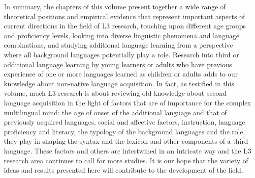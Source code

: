 \documentclass[output=paper,colorlinks,citecolor=brown,nonflat]{langsci/langscibook}
\begin{document}
In summary, the chapters of this volume present together a wide range of theoretical positions and empirical evidence that represent important aspects of current directions in the field of L3 research, touching upon different age groups and proficiency levels, looking into diverse linguistic phenomena and language combinations, and studying additional language learning from a perspective where all background languages potentially play a role. Research into third or additional language learning by young learners or adults who have previous experience of one or more languages learned as children or adults adds to our knowledge about non-native language acquisition. In fact, as testified in this volume, much L3 research is about reviewing old knowledge about second language acquisition in the light of factors that are of importance for the complex multilingual mind: the age of onset of the additional language and that of previously acquired languages, social and affective factors, instruction, language proficiency and literacy, the typology of the background languages and the role they play in shaping the syntax and the lexicon and other components of a third language. These factors and others are intertwined in an intricate way and the L3 research area continues to call for more studies. It is our hope that the variety of ideas and results presented here will contribute to the development of the field.

{\sloppy\printbibliography[heading=subbibliography,notkeyword=this]}
\end{document}
